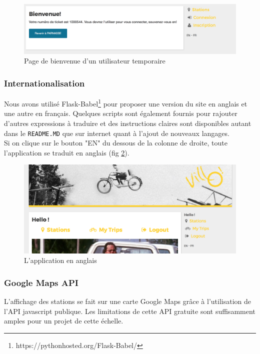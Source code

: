 \documentclass[a4paper]{article}
\begin{document}
    \begin{figure}
	\includegraphics[width=\textwidth]{s17.png}
    \caption{Page de bienvenue d'un utilisateur temporaire}
    \label{fig-s17}
	\end{figure}
    
    \subsubsection{Internationalisation}
    Nous avons utilisé Flask-Babel\footnote{https://pythonhosted.org/Flask-Babel/} pour proposer une version du site en anglais et une autre en français. Quelques scripts sont également fournis pour rajouter d'autres expressions à traduire et des instructions claires sont disponibles autant dans le \texttt{README.MD} que sur internet quant à l'ajout de nouveaux langages.\\
    
    Si on clique sur le bouton "EN" du dessous de la colonne de droite, toute l'application se traduit en anglais (fig \ref{fig-s21}). 
    \begin{figure}
	\includegraphics[width=\textwidth]{s21.png}
    \caption{L'application en anglais}
    \label{fig-s21}
	\end{figure}
    
    \subsubsection{Google Maps API}
    L'affichage des stations se fait sur une carte Google Maps grâce à l'utilisation de l'API javascript publique. Les limitations de cette API gratuite sont suffisamment amples pour un projet de cette échelle.
    
\end{document}
